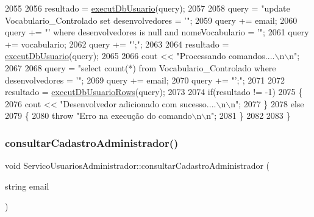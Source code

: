 \begin{DoxyCode}
2055 
2056         resultado = \mbox{\hyperlink{comando_sql_8cpp_a748197580e7f9acdbf48c78de1f7924b}{executDbUsuario}}(query);
2057 
2058         query = \textcolor{stringliteral}{"update Vocabulario\_Controlado set desenvolvedores = '"};
2059         query += email;
2060         query += \textcolor{stringliteral}{"' where desenvolvedores is null and nomeVocabulario = '"};
2061         query += vocabulario;
2062         query += \textcolor{stringliteral}{"';"};
2063 
2064         resultado = \mbox{\hyperlink{comando_sql_8cpp_a748197580e7f9acdbf48c78de1f7924b}{executDbUsuario}}(query);
2065 
2066         cout << \textcolor{stringliteral}{"Processando comandos....\(\backslash\)n\(\backslash\)n"};
2067 
2068         query = \textcolor{stringliteral}{"select count(*) from Vocabulario\_Controlado where desenvolvedores = '"};
2069         query += email;
2070         query += \textcolor{stringliteral}{"';"};
2071 
2072           resultado = \mbox{\hyperlink{comando_sql_8cpp_af54952694f2fa7d76f969fb74b853cb9}{executDbUsuarioRows}}(query);
2073 
2074           \textcolor{keywordflow}{if}(resultado != -1)
2075           \{
2076             cout << \textcolor{stringliteral}{"Desenvolvedor adicionado com sucesso....\(\backslash\)n\(\backslash\)n"};
2077           \}
2078           \textcolor{keywordflow}{else}
2079           \{
2080             \textcolor{keywordflow}{throw} \textcolor{stringliteral}{"Erro na execução do comando\(\backslash\)n\(\backslash\)n"};
2081           \}
2082 
2083 \}
\end{DoxyCode}
\mbox{\label{class_servico_usuarios_administrador_ae1474bec1c712ba5640c83f4fe666fc4}} 
\subsubsection{\texorpdfstring{consultar\+Cadastro\+Administrador()}{consultarCadastroAdministrador()}}
{\footnotesize\ttfamily void Servico\+Usuarios\+Administrador\+::consultar\+Cadastro\+Administrador (\begin{DoxyParamCaption}\item[{string}]{email }\end{DoxyParamCaption})\hspace{0.3cm}{\ttfamily [virtual]}}



